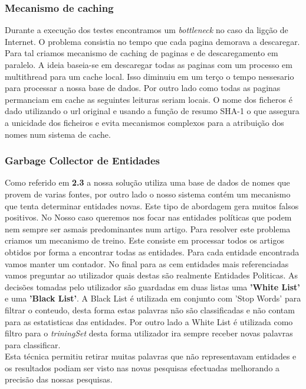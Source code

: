 \subsubsection{Mecanismo de caching}
\hspace{15pt}Durante a execução dos testes encontramos um \textit{bottleneck} no caso da ligção de Internet. O problema consistia no tempo que cada pagina demorava a descaregar. Para tal criamos mecanismo de caching de paginas e de descaregamento em paralelo. A ideia baseia-se em descaregar todas as paginas com um processo em multithread para um cache local. Isso diminuiu em um terço o tempo nessesario para processar a nossa base de dados. Por outro lado como todas as paginas permanciam em cache as seguintes leituras seriam locais. O nome dos ficheros é dado utilizando o url original e usando a função de resumo SHA-1 o que assegura a unicidade dos ficheiros e evita mecanismos complexos para a atribuição dos nomes num sistema de cache.

\subsubsection{Garbage Collector de Entidades}
\hspace{15pt}Como referido em \textbf{2.3} a nossa solução utiliza uma base de dados de nomes que provem de varias fontes, por outro lado o nosso sistema contém um mecanismo que tenta determinar entidades novas. Este tipo de abordagem gera muitos falsos positivos. No Nosso caso queremos nos focar nas entidades políticas que podem nem sempre ser asmais predominantes num artigo. Para resolver este problema criamos um mecanismo de treino. Este consiste em processar todos os artigos obtidos por forma a encontrar todas as entidades. Para cada entidade encontrada vamos manter um contador. No final para as cem entidades mais referenciadas vamos preguntar ao utilizador quais destas são realmente Entidades Politicas. As decisões tomadas pelo utilizador são guardadas em duas listas uma \textbf{'White List'} e uma \textbf{'Black List'}. A Black List é utilizada em conjunto com 'Stop Words' para filtrar o conteudo, desta forma estas palavras não são classificadas e não contam para as estatisticas das entidades. Por outro lado a White List é utilizada como filtro para o \textit{triningSet} desta forma utilizador ira sempre receber novas palavras para classificar.\\
Esta técnica permitiu retirar muitas palavras que não representavam entidades e os resultados podiam ser visto nas novas pesquisas efectuadas melhorando a precisão das nossas pesquisas. \\
